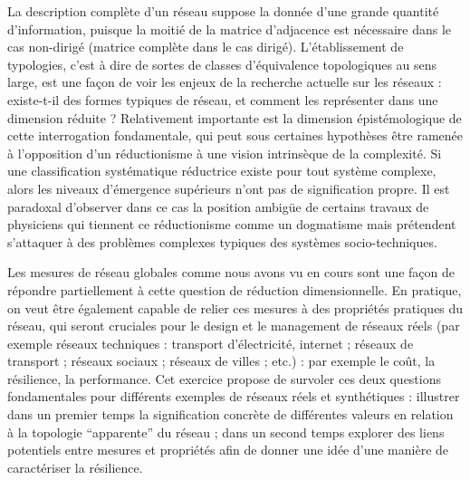 La description complète d'un réseau suppose la donnée d'une grande quantité d'information, puisque la moitié de la matrice d'adjacence est nécessaire dans le cas non-dirigé (matrice complète dans le cas dirigé). L'établissement de typologies, c'est à dire de sortes de classes d'équivalence topologiques au sens large, est une façon de voir les enjeux de la recherche actuelle sur les réseaux : existe-t-il des formes typiques de réseau, et comment les représenter dans une dimension réduite ? Relativement importante est la dimension épistémologique de cette interrogation fondamentale, qui peut sous certaines hypothèses être ramenée à l'opposition d'un réductionisme à une vision intrinsèque de la complexité. Si une classification systématique réductrice existe pour tout système complexe, alors les niveaux d'émergence supérieurs n'ont pas de signification propre. Il est paradoxal d'observer dans ce cas la position ambigüe de certains travaux de physiciens qui tiennent ce réductionisme comme un dogmatisme mais prétendent s'attaquer à des problèmes complexes typiques des systèmes socio-techniques.

Les mesures de réseau globales comme nous avons vu en cours sont une façon de répondre partiellement à cette question de réduction dimensionnelle. En pratique, on veut être également capable de relier ces mesures à des propriétés pratiques du réseau, qui seront cruciales pour le design et le management de réseaux réels (par exemple réseaux techniques : transport d'électricité, internet ; réseaux de transport ; réseaux sociaux ; réseaux de villes ; etc.) : par exemple le coût, la résilience, la performance. Cet exercice propose de survoler ces deux questions fondamentales pour différents exemples de réseaux réels et synthétiques : illustrer dans un premier temps la signification concrète de différentes valeurs en relation à la topologie ``apparente'' du réseau ; dans un second temps explorer des liens potentiels entre mesures et propriétés afin de donner une idée d'une manière de caractériser la résilience.

